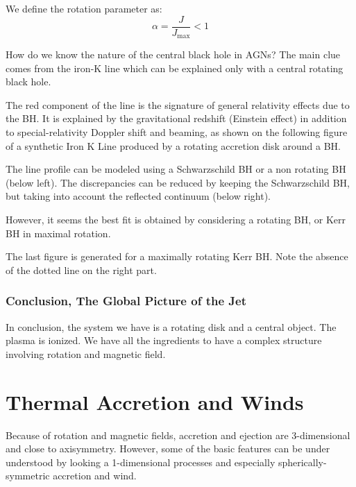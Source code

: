 \documentclass[10pt,a4paper,english]{article}
\begin{document}
We define the rotation parameter as:
\begin{equation}
    \alpha = \frac{J}{J_\mathrm{max}} < 1
\end{equation}

How do we know the nature of the central black hole in AGNs? The main clue
comes from the iron-K line which can be explained only with a central rotating
black hole.


The red component of the line is the signature of general relativity effects
due to the BH. It is explained by the gravitational redshift (Einstein effect)
in addition to special-relativity Doppler shift and beaming, as shown on the
following figure of a synthetic Iron K Line produced by a rotating accretion
disk around a BH.


The line profile can be modeled using a Schwarzschild BH or a non rotating BH
(below left). The discrepancies can be reduced by keeping the Schwarzschild BH,
but taking into account the reflected continuum (below right).


However, it seems the best fit is obtained by considering a rotating BH, or
Kerr BH in maximal rotation.

The last figure is generated for a maximally rotating Kerr BH. Note the absence
of the dotted line on the right part.

\subsubsection{Conclusion, The Global Picture of the Jet}

In conclusion, the system we have is a rotating disk and a central object. The
plasma is ionized. We have all the ingredients to have a complex structure
involving rotation and magnetic field.

\section{Thermal Accretion and Winds}

Because of rotation and magnetic fields, accretion and ejection are
3-dimensional and close to axisymmetry. However, some of the basic features can
be under understood by looking a 1-dimensional processes and especially
spherically-symmetric accretion and wind.
\end{document}
